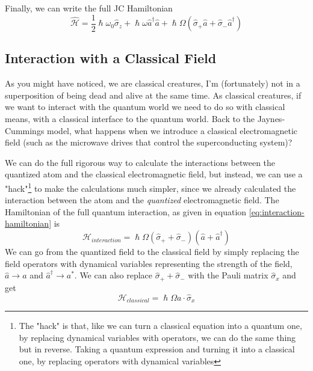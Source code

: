 \par

Finally, we can write the full JC Hamiltonian
\begin{equation} \label{eq:JC-hamiltonian}
    \boxed{\hat{\mathcal{H}} = \frac{1}{2}\hslash \omega_0\hat{\sigma}_z 
                     + \hslash \omega \hat{a}^\dag \hat{a} 
                     +  \hslash\Omega (\hat{\sigma}_+\hat{a} + \hat{\sigma}_-\hat{a}^\dag)}
\end{equation}


\subsection{Interaction with a Classical Field} \label{sec:interaction-with_classical-field}
As you might have noticed, we are classical creatures, I'm (fortunately) not in a superposition of being dead and alive at the same time. As classical creatures, if we want to interact with the quantum world we need to do so with classical means, with a classical interface to the quantum world. Back to the Jaynes-Cummings model, what happens when we introduce a classical electromagnetic field (such as the microwave drives that control the superconducting system)?

We can do the full rigorous way to calculate the interactions between the quantized atom and the classical electromagnetic field, but instead, we can use a "hack"\footnote{The "hack" is that, like we can turn a classical equation into a quantum one, by replacing dynamical variables with operators, we can do the same thing but in reverse. Taking a quantum expression and turning it into a classical one, by replacing operators with dynamical variables} to make the calculations much simpler, since we already calculated the interaction between the atom and the \textit{quantized} electromagnetic field. The Hamiltonian of the full quantum interaction, as given in equation \ref{eq:interaction-hamiltonian} is
\[
    \mathcal{H}_{interaction} = \hslash \Omega (\hat{\sigma}_+ + \hat{\sigma}_-) (\hat{a} + \hat{a}^\dag)
\]
We can go from the quantized field to the classical field by simply replacing the field operators with dynamical variables representing the strength of the field, $\hat{a} \rightarrow a$ and $\hat{a}^\dag \rightarrow a^*$. We can also replace $\hat{\sigma}_+ + \hat{\sigma}_-$ with the Pauli matrix $\hat{\sigma}_x$ and get
\begin{equation}\label{eq:atom-field-class-int}
    \mathcal{H}_{classical} = \hslash \Omega a \cdot \hat{\sigma}_x
\end{equation}

